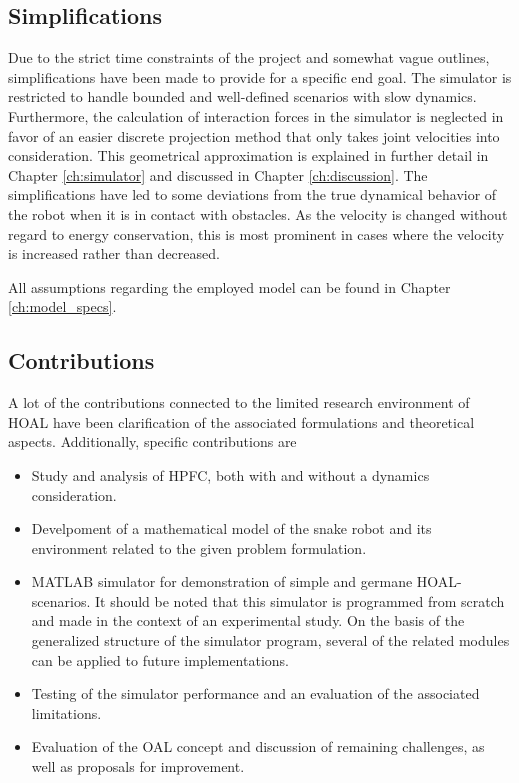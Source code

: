 \subsection{Simplifications}
Due to the strict time constraints of the project and somewhat vague outlines, simplifications have been made to provide for a specific end goal. The simulator is restricted to handle bounded and well-defined scenarios with slow dynamics. Furthermore, the calculation of interaction forces in the simulator is neglected in favor of an easier discrete projection method that only takes joint velocities into consideration. This geometrical approximation is explained in further detail in Chapter \ref{ch:simulator} and discussed in Chapter \ref{ch:discussion}. The simplifications have led to some deviations from the true dynamical behavior of the robot when it is in contact with obstacles. As the velocity is changed without regard to energy conservation, this is most prominent in cases where the velocity is increased rather than decreased.

All assumptions regarding the employed model can be found in Chapter \ref{ch:model_specs}.

\subsection{Contributions}
A lot of the contributions connected to the limited research environment of HOAL have been clarification of the associated formulations and theoretical aspects.
Additionally, specific contributions are 

\begin{itemize}
    \item Study and analysis of HPFC, both with and without a dynamics consideration.
    \item Develpoment of a mathematical model of the snake robot and its environment           related to the given problem formulation.
    \item MATLAB simulator for demonstration of simple and germane HOAL-scenarios.
        It should be noted that this simulator is programmed from scratch and made in the context of an experimental study.
        On the basis of the generalized structure of the simulator program, several of the related modules can be applied to future implementations.
    \item Testing of the simulator performance and an evaluation of the associated             limitations.
    \item Evaluation of the OAL concept and discussion of remaining challenges, as well     as proposals for improvement.
\end{itemize}

